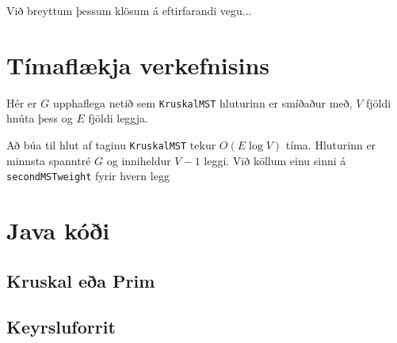 \documentclass[a4paper,oneside]{article}
\begin{document}
Við breyttum þessum klösum á eftirfarandi vegu...


\section{Tímaflækja verkefnisins}
Hér er $G$ upphaflega netið sem \texttt{KruskalMST} hluturinn er smíðaður með, $V$ fjöldi hnúta þess og $E$ fjöldi leggja.

Að búa til hlut af taginu \texttt{KruskalMST} tekur $O(E \log V)$ tíma. Hluturinn er minnsta spanntré $G$ og inniheldur $V-1$ leggi. Við köllum einu sinni á \texttt{secondMSTweight} fyrir hvern legg

\pagebreak
\section{Java kóði}
\subsection{Kruskal eða Prim}

\subsection{Keyrsluforrit}
\end{document}
